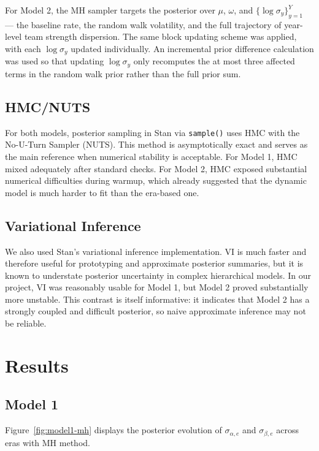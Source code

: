 \documentclass[11pt]{article}
\begin{document}
For Model 2, the MH sampler targets the posterior over $\mu$, $\omega$, and
$\{\log \sigma_y\}_{y=1}^{Y}$ --- the baseline rate, the random walk volatility,
and the full trajectory of year-level team strength dispersion.
The same block updating scheme was applied, with each $\log \sigma_y$ updated
individually. An incremental prior difference calculation was used so that
updating $\log \sigma_y$ only recomputes the at most three affected terms in
the random walk prior rather than the full prior sum.


\subsection{HMC/NUTS}

For both models, posterior sampling in Stan via \texttt{sample()} uses HMC with the No-U-Turn Sampler (NUTS).
This method is asymptotically exact and serves as the main reference when numerical stability is acceptable.
For Model 1, HMC mixed adequately after standard checks.
For Model 2, HMC exposed substantial numerical difficulties during warmup, which already suggested that the dynamic model is much harder to fit than the era-based one.

\subsection{Variational Inference}

We also used Stan's variational inference implementation.
VI is much faster and therefore useful for prototyping and approximate posterior summaries, but it is known to understate posterior uncertainty in complex hierarchical models.
In our project, VI was reasonably usable for Model 1, but Model 2 proved substantially more unstable.
This contrast is itself informative: it indicates that Model 2 has a strongly coupled and difficult posterior, so naive approximate inference may not be reliable.


\section{Results}

\subsection{Model 1}

Figure~\ref{fig:model1-mh} displays the posterior evolution of \(\sigma_{\alpha,e}\) and \(\sigma_{\beta,e}\) across eras with MH method.
\end{document}
